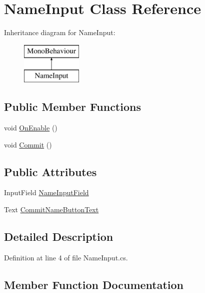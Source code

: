 \hypertarget{class_name_input}{}\section{Name\+Input Class Reference}
\label{class_name_input}
Inheritance diagram for Name\+Input\+:\begin{figure}[H]
\begin{center}
\leavevmode
\includegraphics[height=2.000000cm]{class_name_input}
\end{center}
\end{figure}
\subsection*{Public Member Functions}
\begin{DoxyCompactItemize}
\item 
void \mbox{\hyperlink{class_name_input_a1b37a22538af645721ca082b935901a3}{On\+Enable}} ()
\item 
void \mbox{\hyperlink{class_name_input_aec1965109a8d6d8cff9b9457745e9206}{Commit}} ()
\end{DoxyCompactItemize}
\subsection*{Public Attributes}
\begin{DoxyCompactItemize}
\item 
Input\+Field \mbox{\hyperlink{class_name_input_a94a65c0729c11264f430f84d38b4ece1}{Name\+Input\+Field}}
\item 
Text \mbox{\hyperlink{class_name_input_a112c207988c098b75bc8893db91cb9ed}{Commit\+Name\+Button\+Text}}
\end{DoxyCompactItemize}


\subsection{Detailed Description}


Definition at line 4 of file Name\+Input.\+cs.



\subsection{Member Function Documentation}
\mbox{\label{class_name_input_aec1965109a8d6d8cff9b9457745e9206}} 
